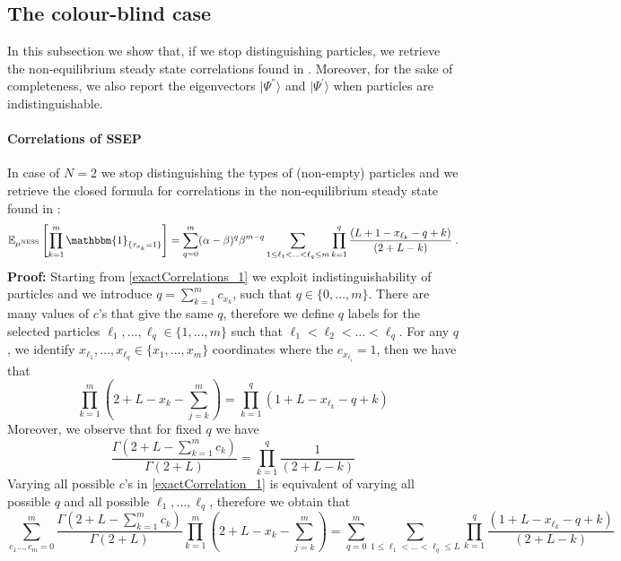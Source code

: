 \documentclass[10pt]{article}
\numberwithin{equation}{section}
\numberwithin{equation}{subsection}
\newcommand{\dt}{\;.}
\begin{document}
\subsection{The colour-blind case}
In this subsection we show that, if we stop distinguishing particles, we retrieve the non-equilibrium steady state correlations found in \cite{frassek2020eigenstates}. Moreover, for the sake of completeness, we also report the eigenvectors $|\Psi^{''}\rangle$ and $|\Psi^{'}\rangle$ when particles are indistinguishable.
\paragraph{Correlations of SSEP}
 In case of $N=2$ we stop distinguishing the types of (non-empty) particles and we retrieve the closed formula for correlations in the non-equilibrium steady state found in \cite[(4.26)]{frassek2020eigenstates}:  
\begin{equation}
	\mathbb{E}_{\mu^{\text{NESS}}}\left[\prod_{k=1}^{m}\mathbbm{1}_{\{\tau_{x_{k}}=1\}}\right]=\sum_{q=0}^{m}(\alpha-\beta)^{q}\beta^{m-q}\sum_{1\leq \ell_{1}<\ldots<\ell_{q}\leq m}\prod_{k=1}^{q}\frac{\left(L+1-x_{\ell_{k}}-q+k\right)}{(2+L-k)}\dt
\end{equation} 
\textbf{Proof:} Starting from \eqref{exactCorrelations_1} we exploit indistinguishability of particles and we introduce $q=\sum_{k=1}^{m}c_{x_{k}}$, such that $q\in\{0,\ldots,m\}$. There are many values of $c$'s that give the same $q$, therefore we define $q$ labels for the selected particles $\ell_{1},\ldots,\ell_{q}\in \{1,\ldots,m\}$ such that  $\ell_{1}<\ell_{2}<\ldots<\ell_{q}$. For any $q$, we identify $x_{\ell_{1}},\ldots,x_{\ell_{q}}\in\{x_{1},\dots,x_{m}\}$ coordinates where the $c_{x_{\ell_{i}}}=1$, then we have that 
	\begin{equation}
		\prod_{k=1}^{m}\left(2+L-x_{k}-\sum_{j=k}^{m}\right)=\prod_{k=1}^{q}\left(1+L-x_{\ell_{k}}-q+k\right)
	\end{equation}
Moreover, we observe that for fixed $q$ we have
\begin{equation}
	\frac{\Gamma(2+L-\sum_{k=1}^{m}c_{k})}{\Gamma(2+L)}=\prod_{k=1}^{q}\frac{1}{(2+L-k)}
\end{equation}
Varying all possible $c$'s in \eqref{exactCorrelation_1} is equivalent of varying all possible $q$ and all possible $\ell_{1},\ldots,\ell_{q}$, therefore we obtain that 
\begin{equation}
	\sum_{c_{1}\ldots,c_{m}=0}^{m}\frac{\Gamma(2+L-\sum_{k=1}^{m}c_{k})}{\Gamma(2+L)}\prod_{k=1}^{m}\left(2+L-x_{k}-\sum_{j=k}^{m}\right)=\sum_{q=0}^{m}\sum_{1\leq \ell_{1}<\ldots<\ell_{q}\leq L}\prod_{k=1}^{q}\frac{(1+L-x_{\ell_{k}}-q+k)}{(2+L-k)}
\end{equation}
\end{document}
